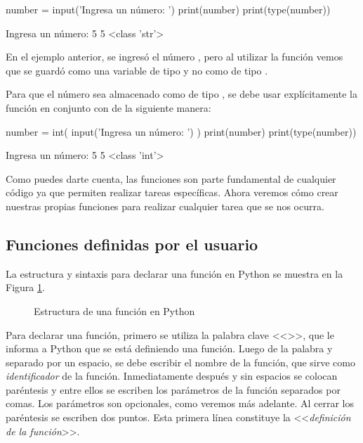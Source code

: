 \begin{pyin}
number = input('Ingresa un número: ')
print(number)
print(type(number))
\end{pyin}
\begin{pyout}
Ingresa un número:  5
5
<class 'str'>
\end{pyout}

En el ejemplo anterior, se ingresó el número , pero al utilizar la función  vemos que se guardó como una variable de tipo  y no como de tipo . 

Para que el número sea almacenado como de tipo , se debe usar explícitamente la función  en conjunto con  de la siguiente manera:

\begin{pyin}
number = int( input('Ingresa un número: ') )
print(number)
print(type(number))
\end{pyin}
\begin{pyout}
Ingresa un número:  5
5
<class 'int'>
\end{pyout}

Como puedes darte cuenta, las funciones son parte fundamental de cualquier código ya que permiten realizar tareas específicas. Ahora veremos cómo crear nuestras propias funciones para realizar cualquier tarea que se nos ocurra.

\subsection{Funciones definidas por el usuario}
La estructura y sintaxis para declarar una función en Python se muestra en la Figura \ref{fig:func-structure}.

\begin{figure}[htb]
    \centering
    
    \caption{Estructura de una función en Python}
    \label{fig:func-structure}
\end{figure}

Para declarar una función, primero se utiliza la palabra clave <<>>, que le informa a Python que se está definiendo una función. Luego de la palabra  y separado por un espacio, se debe escribir el nombre de la función, que sirve como \emph{identificador} de la función. Inmediatamente después y sin espacios se colocan paréntesis y entre ellos se escriben los parámetros de la función separados por comas. Los parámetros son opcionales, como veremos más adelante. Al cerrar los paréntesis se escriben dos puntos. Esta primera línea constituye la <<\emph{definición de la función}>>.

